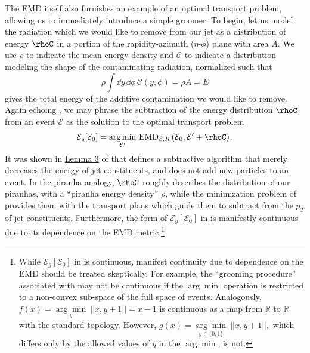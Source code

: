 The EMD itself also furnishes an example of an optimal transport problem, allowing us to immediately introduce a simple \PIRANHA{} groomer.
%
To begin, let us model the radiation which we would like to remove from our jet as a distribution of energy \(\rhoC\) in a portion of the rapidity-azimuth (\(\eta\)-\(\phi\)) plane with area \(A\).
%
We use \(\rho\) to indicate the mean energy density and \(\mathcal{C}\) to indicate a distribution modeling the shape of the contaminating radiation, normalized such that
\begin{equation}
    \rho\int \dd y\,\dd\phi\,\mathcal{C}(y,\phi) = \rho A = E
\end{equation}
gives the total energy of the additive contamination we would like to remove.
%
Again echoing , we may phrase the subtraction of the energy distribution \(\rhoC\) from an event \(\mathcal{E}\) as the solution to the optimal transport problem
\begin{align}
    \mathcal{E}_g[\mathcal E_0] = \underset{\mathcal{E}'}{\arg \min}\ {\rm EMD}_{\beta, R}
    \left(\mathcal{E}_0, \mathcal{E}' + \rhoC\right)
    \label{eqn:simple_piranha}
    .
\end{align}
%
It was shown in \href{https://arxiv.org/pdf/2004.04159.pdf#page=33\&zoom=100,0,0}{Lemma 3} of  that  defines a subtractive algorithm that merely decreases the energy of jet constituents, and does not add new particles to an event.
%
In the piranha analogy, \(\rhoC\) roughly describes the distribution of our piranhas, with a ``piranha energy density'' \(\rho\), while the minimization problem of  provides them with the transport plans which guide them to subtract from the \(p_T\) of jet constituents.
%
Furthermore, the form of \(\mathcal{E}_g[\mathcal E_0]\) in  is manifestly continuous due to its dependence on the EMD metric.\footnote{
While \(\mathcal{E}_g[\mathcal E_0]\) in  is continuous, manifest continuity due to dependence on the EMD should be treated skeptically.
%
For example, the ``grooming procedure'' associated with   may not be continuous if the \(\arg \min\) operation is restricted to a non-convex sub-space of the full space of events.
%
Analogously, \(
    f(x)
    =
    \underset{y}{\arg \min}\ ||x, y+1||
    =
    x-1
\)
is continuous as a map from \(\mathbb R\) to \(\mathbb R\) with the standard topology.
%
However, \(
    g(x)
    =
    \underset{y \in \{0, 1\}}{\arg \min}\ ||x, y+1||,
\)
which differs only by the allowed values of \(y\) in the \(\arg \min\), is not.
}



